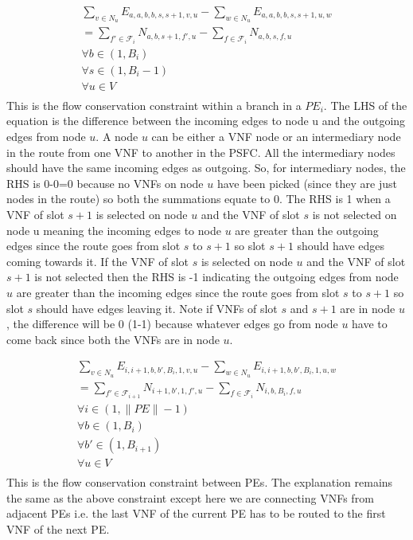 \documentclass[journal]{IEEEtran}
\begin{document}
\begin{equation}
\begin{split}
     \sum_{v \in N_u} E_{a,a,b,b,s,s+1,v,u} - \sum_{w \in N_u} E_{a,a,b,b,s,s+1,u,w} \\
     = \sum_{f' \in \mathcal{F}_i} N_{a,b,s+1,f',u} - \sum_{f \in \mathcal{F}_i} N_{a,b,s,f,u} \\
     \forall b \in (1,B_i) \\
     \forall s \in (1,B_i-1) \\
     \forall u \in V \\
\end{split}
\end{equation}
This is the flow conservation constraint within a branch in a $PE_i$. The LHS of the equation is the difference between the incoming edges to node u and the outgoing edges from node $u$. A node $u$ can be either a VNF node or an intermediary node in the route from one VNF to another in the PSFC. All the intermediary nodes should have the same incoming edges as outgoing. So, for intermediary nodes, the RHS is 0-0=0 because no VNFs on node $u$ have been picked (since they are just nodes in the route) so both the summations equate to 0. The RHS is 1 when a VNF of slot $s+1$ is selected on node $u$ and the VNF of slot $s$ is not selected on node u meaning the incoming edges to node $u$ are greater than the outgoing edges since the route goes from slot $s$ to $s+1$ so slot $s+1$ should have edges coming towards it. If the VNF of slot $s$ is selected on node $u$ and the VNF of slot $s+1$ is not selected then the RHS is -1 indicating the outgoing edges from node $u$ are greater than the incoming edges since the route goes from slot $s$ to $s+1$ so slot $s$ should have edges leaving it.
Note if VNFs of slot $s$ and $s+1$ are in node $u$, the difference will be 0 (1-1) because whatever edges go from node $u$ have to come back since both the VNFs are in node $u$.

\begin{equation}
\begin{split}
     \sum_{v \in N_u} E_{i,i+1,b,b',B_i,1,v,u} - \sum_{w \in N_u} E_{i,i+1,b,b',B_i,1,u,w} \\
     = \sum_{f' \in \mathcal{F}_{i+1}} N_{i+1,b',1,f',u} - \sum_{f \in \mathcal{F}_i} N_{i,b,B_i,f,u} \\
     \forall i \in (1,\lVert PE \rVert-1) \\
     \forall b \in (1,B_i) \\
     \forall b' \in (1,B_{i+1}) \\
     \forall u \in V \\
\end{split}
\end{equation}
This is the flow conservation constraint between PEs. The explanation remains the same as the above constraint except here we are connecting VNFs from adjacent PEs i.e. the last VNF of the current PE has to be routed to the first VNF of the next PE.
\end{document}
